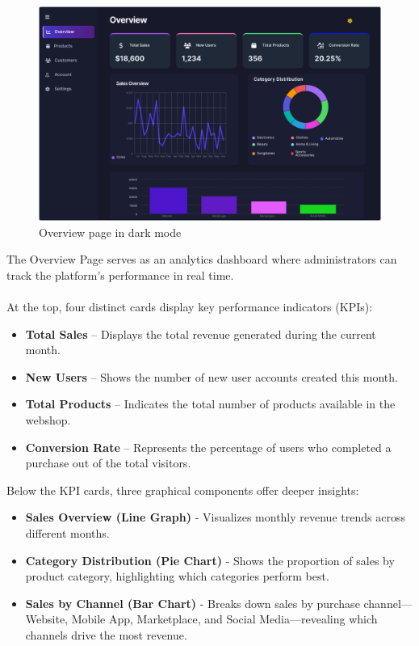 \documentclass[11pt,a4paper]{article}
\begin{document}
	
	\begin{figure}[h]
		\centering
		\includegraphics[width=1\textwidth]{pictures/admin/Overview_Admin}
		\caption{Overview page in dark mode}\label{fig:figure1}
	\end{figure}
	\vspace{0.3cm}
	The Overview Page serves as an analytics dashboard where administrators can track the platform’s performance in real time. \\ \\
	At the top, four distinct cards display key performance indicators (KPIs):
	\begin{itemize}
		\item \textbf{Total Sales} – Displays the total revenue generated during the current month.
		\item \textbf{New Users} – Shows the number of new user accounts created this month.
		\item \textbf{Total Products} – Indicates the total number of products available in the webshop.
		\item \textbf{Conversion Rate} – Represents the percentage of users who completed a purchase out of the total visitors.
	\end{itemize}
	Below the KPI cards, three graphical components offer deeper insights:
	\begin{itemize}
		\item \textbf{Sales Overview (Line Graph)} - Visualizes monthly revenue trends across different months.
		\item \textbf{Category Distribution (Pie Chart)} - Shows the proportion of sales by product category, highlighting which categories perform best.
		\item \textbf{Sales by Channel (Bar Chart)} - Breaks down sales by purchase channel—Website, Mobile App, Marketplace, and Social Media—revealing which channels drive the most revenue.
	\end{itemize}
	
\end{document}
